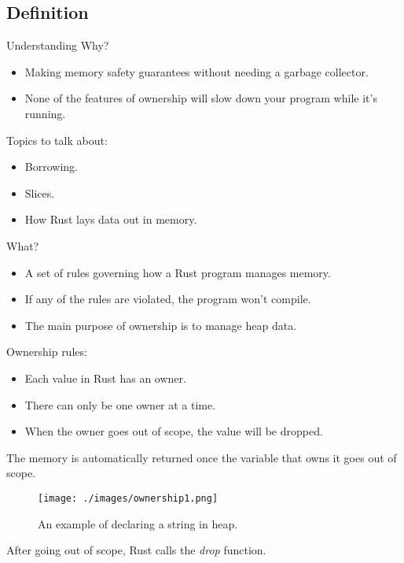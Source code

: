 \documentclass[10pt]{beamer}
\begin{document}
\subsection{Definition}
\begin{frame}{Understanding}
    Why?
    \begin{itemize}
        \item Making memory safety guarantees without needing a garbage collector.\cite{rust-book}
        \item None of the features of ownership will slow down your program while it’s running.\cite{rust-book}
    \end{itemize}

    Topics to talk about:
    \begin{itemize}
        \item Borrowing.
        \item Slices.
        \item How Rust lays data out in memory.
    \end{itemize}

    What?
    \begin{itemize}
        \item A set of rules governing how a Rust program manages memory.\cite{rust-book}
        \item If any of the rules are violated, the program won’t compile.\cite{rust-book}
        \item The main purpose of ownership is to manage heap data.\cite{rust-book}
    \end{itemize}
\end{frame}

\begin{frame}
    Ownership rules:
    \begin{itemize}
        \item Each value in Rust has an owner.
        \item There can only be one owner at a time.
        \item When the owner goes out of scope, the value will be dropped.
    \end{itemize}

    The memory is automatically returned once the variable that owns it goes out of scope.\cite{rust-book}

    \begin{figure}[htpb]
        \centering
        \texttt{[image: ./images/ownership1.png]}
        \caption{An example of declaring a string in heap.\cite{rust-book}}
    \end{figure}

    After going out of scope, Rust calls the \textit{drop} function.
\end{frame}
\end{document}
